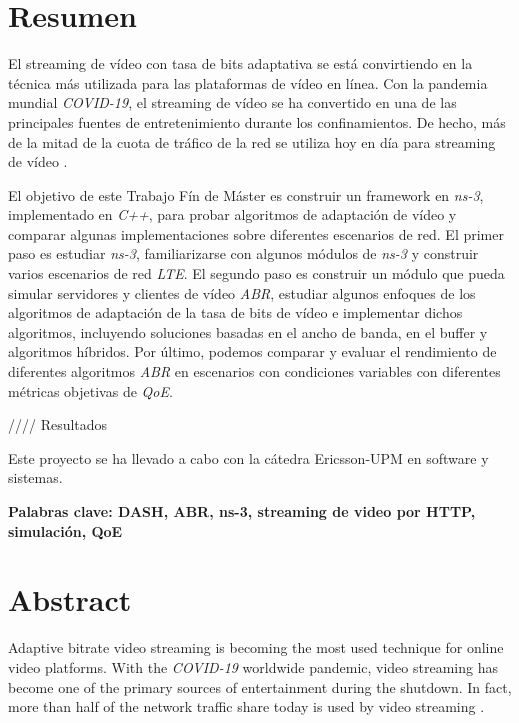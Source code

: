 \cleardoublepage
{}
\chapter*{Resumen}

El streaming de vídeo con tasa de bits adaptativa se está convirtiendo 
en la técnica más utilizada para las plataformas de vídeo en línea. 
Con la pandemia mundial \textit{COVID-19}, el streaming de vídeo se ha convertido 
en una de las principales fuentes de entretenimiento durante los confinamientos. 
De hecho, más de la mitad de la cuota de tráfico de la red se utiliza hoy en 
día para streaming de vídeo \cite{sandvine1}.

El objetivo de este Trabajo Fín de Máster es construir un framework en \textit{ns-3},
implementado en \textit{C++}, para probar algoritmos de adaptación de vídeo y comparar
algunas implementaciones sobre diferentes escenarios de red. El primer paso 
es estudiar \textit{ns-3}, familiarizarse con algunos módulos de \textit{ns-3} y construir varios 
escenarios de red \textit{LTE}. El segundo paso es construir un módulo que pueda simular 
servidores y clientes de vídeo \textit{ABR}, estudiar algunos enfoques de los algoritmos
de adaptación de la tasa de bits de vídeo e implementar dichos algoritmos, 
incluyendo soluciones basadas en el ancho de banda, en el buffer y algoritmos 
híbridos. 
Por último, podemos comparar y evaluar el rendimiento de diferentes algoritmos 
\textit{ABR} en escenarios con condiciones variables con diferentes métricas objetivas 
de \textit{QoE}.

//// Resultados

Este proyecto se ha llevado a cabo con la cátedra Ericsson-UPM en software y sistemas.



\vfill
\textbf{Palabras clave: DASH, ABR, ns-3, streaming de video por HTTP, simulación, QoE} 


\cleardoublepage
{}
\chapter*{Abstract}

Adaptive bitrate video streaming is becoming the most used technique for online
video platforms. With the \textit{COVID-19} worldwide pandemic, video streaming has become
one of the primary sources of entertainment during the shutdown. In fact, more
than half of the network traffic share today is used by video streaming \cite{sandvine1}.

